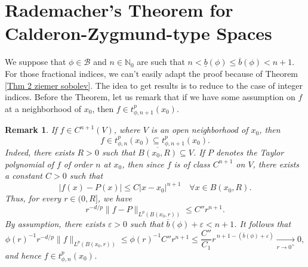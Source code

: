 \documentclass[a4paper,10pt]{article}
\theoremstyle{thmstyleone}%
\theoremstyle{thmstyletwo}%
\newtheorem{remark}{Remark}%
\theoremstyle{thmstylethree}%
\begin{document}
\section{Rademacher's Theorem for Calderon-Zygmund-type Spaces}\label{sec4}
We suppose that $\phi\in\mathcal{B}$ and $n\in\mathbb{N}_0$ are such that $n<\underline{b}(\phi)\leq \overline{b}(\phi)<n+1$. For those fractional indices, we can't easily adapt the proof because of Theorem \ref{Thm 2 ziemer sobolev}. The idea to get results is to reduce to the case of integer indices. Before the Theorem, let us remark that if we have some assumption on $f$ at a neighborhood of $x_0$, then $f\in t^p_{\phi,n+1}(x_0)$.
\begin{remark}
If $f \in C^{n+1}(V)$, where $V$ is an open neighborhood of $x_0$, then $$f \in t^p_{\phi,n}(x_0)\subseteq t^p_{\phi,n+1}(x_0).$$ Indeed, there exists $R > 0$ such that $\overline{B(x_0,R)} \subseteq V$. If $P$ denotes the Taylor polynomial of $f$ of order $n$ at $x_0$, then since $f$ is of class $C^{n+1}$ on $V$, there exists a constant $C > 0$ such that
\[
|f(x)-P(x)| \leq C|x-x_0|^{n+1} \quad \forall x \in B(x_0,R).
\]
Thus, for every $r \in (0,R]$, we have
\[
r^{-d/p}\|f-P\|_{L^p(B(x_0,r))} \leq C'' r^{n+1}.
\]
By assumption, there exists $\varepsilon > 0$ such that $\overline{b}(\phi) + \varepsilon < n+1$.  
It follows that
\[
\phi(r)^{-1} r^{-d/p}\|f\|_{L^p(B(x_0,r))}
\leq \phi(r)^{-1} C'' r^{n+1}
\leq \frac{C''}{C_1} r^{\,n+1-(\overline{b}(\phi)+\varepsilon)} \underset{r \to 0^+}{\longrightarrow} 0,
\]
and hence $f \in t^p_{\phi,n}(x_0)$.
\end{remark}
\end{document}
